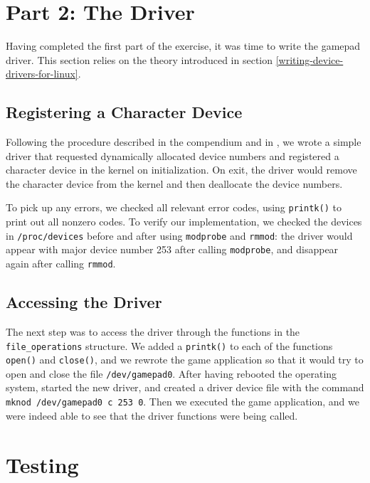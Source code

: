 \section{Part 2: The Driver}
Having completed the first part of the exercise, it was time to write the gamepad driver. This section relies on the theory introduced in section \ref{writing-device-drivers-for-linux}.

\subsection{Registering a Character Device}
Following the procedure described in the compendium and in \cite{linux-device-drivers}, we wrote a simple driver that requested dynamically allocated device numbers and registered a character device in the kernel on initialization. On exit, the driver would remove the character device from the kernel and then deallocate the device numbers.

To pick up any errors, we checked all relevant error codes, using \texttt{printk()} to print out all nonzero codes. To verify our implementation, we checked the devices in \texttt{/proc/devices} before and after using \texttt{modprobe} and \texttt{rmmod}: the driver would appear with major device number 253 after calling \texttt{modprobe}, and disappear again after calling \texttt{rmmod}.

\subsection{Accessing the Driver}
The next step was to access the driver through the functions in the \texttt{file\_operations} structure. We added a \texttt{printk()} to each of the functions \texttt{open()} and \texttt{close()}, and we rewrote the game application so that it would try to open and close the file \texttt{/dev/gamepad0}. After having rebooted the operating system, started the new driver, and created a driver device file with the command \texttt{mknod /dev/gamepad0 c 253 0}. Then we executed the game application, and we were indeed able to see that the driver functions were being called.



\section{Testing}
